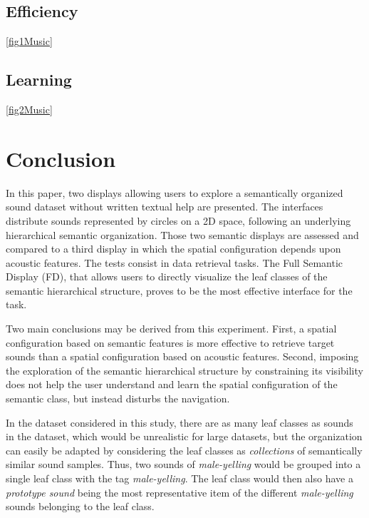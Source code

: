 \documentclass{aes2e}
\begin{document}
\subsection{Efficiency}

\ref{fig1Music}

\subsection{Learning}

\ref{fig2Music}

\section{Conclusion}

In this paper, two displays allowing users to explore a semantically organized sound dataset without written textual help are presented. The interfaces distribute sounds represented by circles on a 2D space, following an underlying hierarchical semantic organization. Those two semantic displays are assessed and compared to a third display in which the spatial configuration depends upon acoustic features. The tests consist in data retrieval tasks. 
The Full Semantic Display (FD), that allows users to directly visualize the leaf classes of the semantic hierarchical structure, proves to be the most effective interface for the task.

Two main conclusions may be derived from this experiment. First, a spatial configuration based on semantic features is more effective to retrieve target sounds than a spatial configuration based on acoustic features. Second, imposing the exploration of the semantic hierarchical structure by constraining its visibility does not help the user understand and learn the spatial configuration of the semantic class, but instead disturbs the navigation. 

In the dataset considered in this study, there are as many leaf classes as sounds in the dataset, which would be unrealistic for large datasets, but the organization can easily be adapted by considering the leaf classes as \textit{collections} of semantically similar sound samples. Thus, two sounds of \textit{male-yelling} would be grouped into a single leaf class with the tag \textit{male-yelling}. The leaf class would then also have a \textit{prototype sound} being the most representative item of the different \textit{male-yelling} sounds belonging to the leaf class.

%
\end{document}
